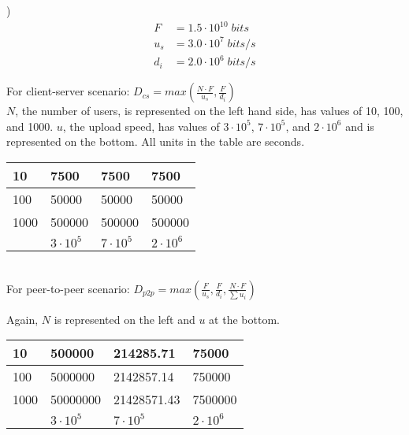 \documentclass[12pt]{report}
\begin{document}
)
\begin{align*}
F &= 1.5 \cdot 10^{10}\;bits\\
u_s &= 3.0 \cdot 10^7\;bits/s\\
d_i &= 2.0 \cdot 10^6\;bits/s
\end{align*}

\centering

For client-server scenario: $D_{cs} = max\left(\frac{N\cdot{}F}{u_s}, \frac{F}{d_i}\right)$\\
\medskip
$N$, the number of users, is represented on the left hand side, has values of 10, 100, and 1000. $u$, the upload speed, has values of $3\cdot10^5$, $7\cdot10^5$, and $2\cdot10^6$ and is represented on the bottom. All units in the table are seconds.

\begin{table}[h]
	\centering
	\begin{tabular}{l|l|l|l|}
		\hline
		\multicolumn{1}{|l|}{10}  & 7500                    & 7500                    & 7500                    \\ \hline
		\multicolumn{1}{|l|}{100} & 50000                   & 50000                   & 50000                   \\ \hline
		\multicolumn{1}{|l|}{1000} & 500000 & 500000 & 500000 \\ \hline
		& $3\cdot10^5$ & $7\cdot10^5$ & $2\cdot10^6$ \\ \cline{2-4} 
	\end{tabular}
\end{table}
\hrulefill\\
\medskip
For peer-to-peer scenario: $D_{p2p} = max\left(\frac{F}{u_s}, \frac{F}{d_i}, \frac{N\cdot{}F}{\sum{u_i}}\right)$

Again, $N$ is represented on the left and $u$ at the bottom.

\begin{table}[h]
	\centering
	\begin{tabular}{l|l|l|l|}
		\hline
		\multicolumn{1}{|l|}{10}  & 500000                    & 214285.71                    & 75000                    \\ \hline
		\multicolumn{1}{|l|}{100} & 5000000                   & 2142857.14                   & 750000                   \\ \hline
		\multicolumn{1}{|l|}{1000} & 50000000 & 21428571.43 & 7500000 \\ \hline
		& $3\cdot10^5$ & $7\cdot10^5$ & $2\cdot10^6$ \\ \cline{2-4} 
	\end{tabular}
\end{table}
\end{document}
